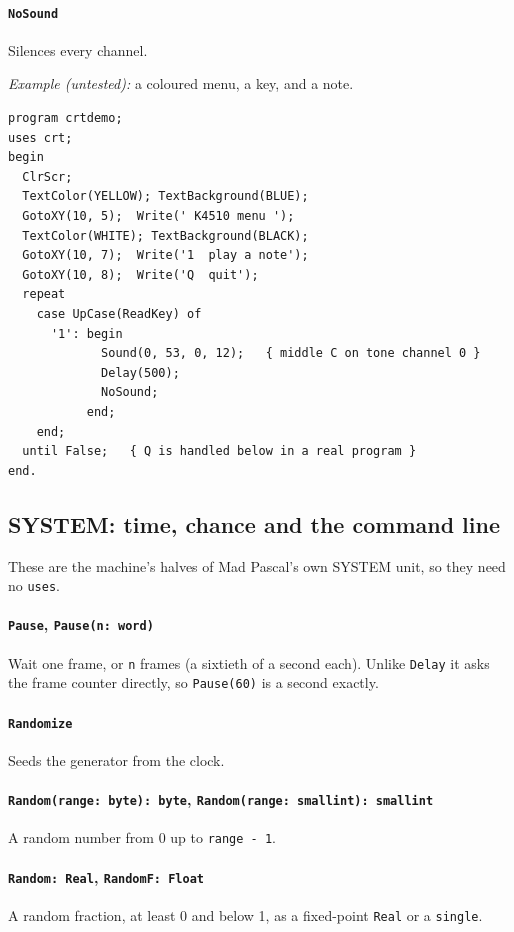 \paragraph{\texttt{NoSound}} Silences every channel.

\noindent\emph{Example (untested):} a coloured menu, a key, and a note.

\begin{verbatim}
program crtdemo;
uses crt;
begin
  ClrScr;
  TextColor(YELLOW); TextBackground(BLUE);
  GotoXY(10, 5);  Write(' K4510 menu ');
  TextColor(WHITE); TextBackground(BLACK);
  GotoXY(10, 7);  Write('1  play a note');
  GotoXY(10, 8);  Write('Q  quit');
  repeat
    case UpCase(ReadKey) of
      '1': begin
             Sound(0, 53, 0, 12);   { middle C on tone channel 0 }
             Delay(500);
             NoSound;
           end;
    end;
  until False;   { Q is handled below in a real program }
end.
\end{verbatim}

\subsection*{SYSTEM: time, chance and the command line}
These are the machine's halves of Mad Pascal's own SYSTEM unit, so they need
no \verb|uses|.

\paragraph{\texttt{Pause}, \texttt{Pause(n: word)}} Wait one frame, or
\verb|n| frames (a sixtieth of a second each). Unlike \verb|Delay| it asks
the frame counter directly, so \verb|Pause(60)| is a second exactly.

\paragraph{\texttt{Randomize}} Seeds the generator from the clock.

\paragraph{\texttt{Random(range: byte): byte}, \texttt{Random(range: smallint): smallint}}
A random number from 0 up to \verb|range - 1|.

\paragraph{\texttt{Random: Real}, \texttt{RandomF: Float}} A random fraction,
at least 0 and below 1, as a fixed-point \verb|Real| or a \verb|single|.

